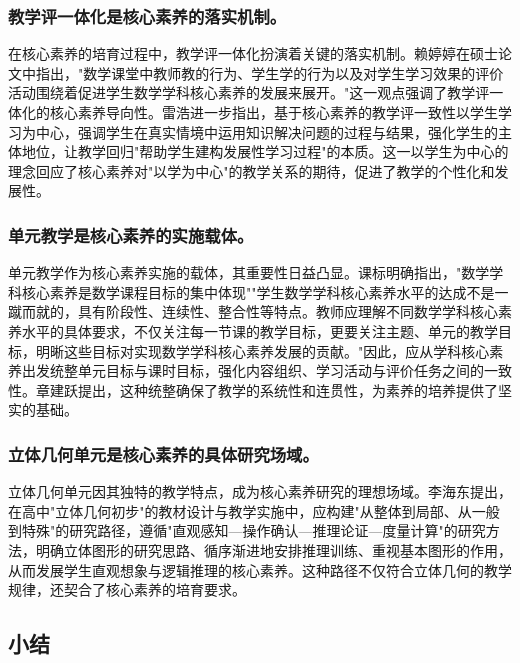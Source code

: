 \documentclass[UTF8,a4paper,12pt,twoside]{ctexart}
\begin{document}
\subsubsection{教学评一体化是核心素养的落实机制。}
在核心素养的培育过程中，教学评一体化扮演着关键的落实机制。赖婷婷\cite{lai2024}在硕士论文中指出，"数学课堂中教师教的行为、学生学的行为以及对学生学习效果的评价活动围绕着促进学生数学学科核心素养的发展来展开。"这一观点强调了教学评一体化的核心素养导向性。雷浩\cite{lei2023}进一步指出，基于核心素养的教学评一致性以学生学习为中心，强调学生在真实情境中运用知识解决问题的过程与结果，强化学生的主体地位，让教学回归"帮助学生建构发展性学习过程"的本质。这一以学生为中心的理念回应了核心素养对"以学为中心"的教学关系的期待，促进了教学的个性化和发展性。

\subsubsection{单元教学是核心素养的实施载体。}
单元教学作为核心素养实施的载体，其重要性日益凸显。课标\cite{gaozhong_kebiao2020}明确指出，"数学学科核心素养是数学课程目标的集中体现""学生数学学科核心素养水平的达成不是一蹴而就的，具有阶段性、连续性、整合性等特点。教师应理解不同数学学科核心素养水平的具体要求，不仅关注每一节课的教学目标，更要关注主题、单元的教学目标，明晰这些目标对实现数学学科核心素养发展的贡献。"因此，应从学科核心素养出发统整单元目标与课时目标，强化内容组织、学习活动与评价任务之间的一致性。章建跃\cite{zhang2020}提出，这种统整确保了教学的系统性和连贯性，为素养的培养提供了坚实的基础。

\subsubsection{立体几何单元是核心素养的具体研究场域。}
立体几何单元因其独特的教学特点，成为核心素养研究的理想场域。李海东\cite{li2019}提出，在高中"立体几何初步"的教材设计与教学实施中，应构建"从整体到局部、从一般到特殊"的研究路径，遵循"直观感知—操作确认—推理论证—度量计算"的研究方法，明确立体图形的研究思路、循序渐进地安排推理训练、重视基本图形的作用，从而发展学生直观想象与逻辑推理的核心素养。这种路径不仅符合立体几何的教学规律，还契合了核心素养的培育要求。

\subsection{小结}
\end{document}
